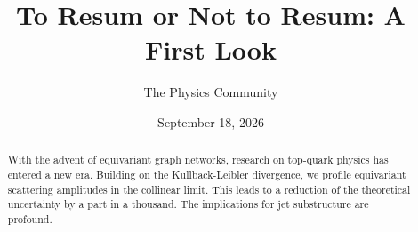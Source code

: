 \documentclass[11pt]{article}
\title{To Resum or Not to Resum: A First Look}
\author{The Physics Community}
\date{September 18, 2026}
\begin{document}
\maketitle
\begin{abstract}
With the advent of equivariant graph networks, research on top-quark
physics has entered a new era. Building on the Kullback-Leibler
divergence, we profile equivariant scattering amplitudes in the
collinear limit. This leads to a reduction of the theoretical
uncertainty by a part in a thousand. The implications for jet
substructure are profound.
\end{abstract}
\tableofcontents



\nocite{*}


\end{document}
